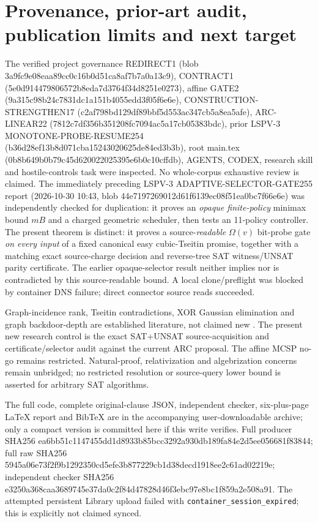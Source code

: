 \documentclass[11pt]{article}
\begin{document}
\section{Provenance, prior-art audit, publication limits and next target}
The verified project governance REDIRECT1 (blob 3a9fc9e08eaa89cc0c16b0d51ca8af7b7a0a13c9), CONTRACT1 (5e0d914479806572b8eda7d3764f34d8251e0273), affine GATE2 (9a315c98b24c7831dc1a151b4055edd3f05f6e6e), CONSTRUCTION-STRENGTHEN17 (c2af798bd129df89bbf5d553ac347cb5a8ea5afe), ARC-LINEAR22 (7812c7df356b351208fc7094ac5a17cb05383bdc), prior LSPV-3 MONOTONE-PROBE-RESUME254 (b36d28ef13b8d071cba15243020625de84ed3b3b), root main.tex (0b8b649b0b79c45d620022025395e6b0c10cffdb), AGENTS, CODEX, research skill and hostile-controls task were inspected. No whole-corpus exhaustive review is claimed. The immediately preceding LSPV-3 ADAPTIVE-SELECTOR-GATE255 report (2026-10-30 10:43, blob 44e7197269012d61f6139ec08f51ea0bc7f66e6e) was independently checked for duplication: it proves an \emph{opaque finite-policy} minimax bound $mB$ and a charged geometric scheduler, then tests an 11-policy controller. The present theorem is distinct: it proves a source-\emph{readable} $\Omega(v)$ bit-probe gate \emph{on every input} of a fixed canonical easy cubic-Tseitin promise, together with a matching exact source-charge decision and reverse-tree SAT witness/UNSAT parity certificate. The earlier opaque-selector result neither implies nor is contradicted by this source-readable bound. A local clone/preflight was blocked by container DNS failure; direct connector source reads succeeded.

Graph-incidence rank, Tseitin contradictions, XOR Gaussian elimination and graph backdoor-depth are established literature, not claimed new \cite{f1,f2,f3}. The present new research control is the exact SAT+UNSAT source-acquisition and certificate/selector audit against the current ARC proposal. The affine MCSP no-go remains restricted. Natural-proof, relativization and algebrization concerns remain unbridged; no restricted resolution or source-query lower bound is asserted for arbitrary SAT algorithms.

The full code, complete original-clause JSON, independent checker, six-plus-page LaTeX report and BibTeX are in the accompanying user-downloadable archive; only a compact version is committed here if this write verifies. Full producer SHA256 ea6bb51c1147455dd1d8933b85bcc3292a930db189fa84e2d5ee056681f83844; full raw SHA256 5945a06e73f2f9b1292350cd5efe3b877229cb1d38decd1918ee2c61ad02219e; independent checker SHA256 e3250a368caa3689745e37da0c2f84d47828d46f3ebc97e8bc1f859a2e508a91. The attempted persistent Library upload failed with \texttt{container\_session\_expired}; this is explicitly not claimed synced.
\end{document}
